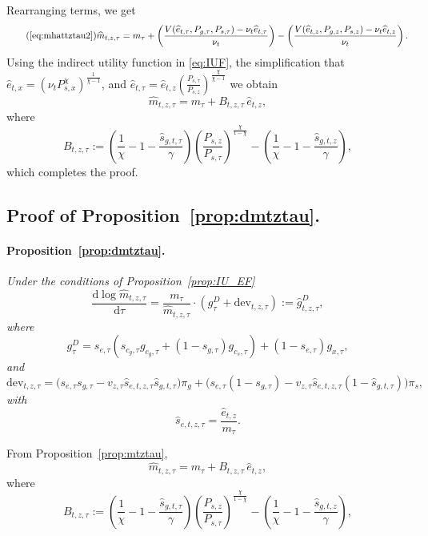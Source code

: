 \documentclass[12pt,a4paper]{article}
\begin{document}
\begin{appendices}
\noindent Rearranging terms, we get %
\[\tag{\ref{eq:mhattztau2}}
\widehat{m}_{t,z,\tau} 
= m_{\tau} +
\left( \frac{V(\widehat{e}_{t,\tau} , P_{g,\tau}, P_{s,\tau}) - \nu_t  \widehat{e}_{t,\tau}}{\nu_t}\right) 
- \left( \frac{V(\widehat{e}_{t,z} , P_{g,z}, P_{s,z}) - \nu_t  \widehat{e}_{t,z}}{\nu_t}\right) .
\]
Using the indirect utility function in \eqref{eq:IUF}, the simplification that $\widehat{e}_{t,x}=(\nu_{t}P_{s,x}^{\chi})^{\frac{1}{\chi-1}}$, and $\widehat{e}_{t,\tau}=\widehat{e}_{t,z}\left(\frac{P_{s,\tau}}{P_{s,z}}\right)^{\frac{\chi}{\chi-1}}$ we obtain
\[
\widehat{m}_{t,z,\tau} = m_{\tau} + B_{t,z,\tau} \,  \widehat e_{t,z},
\]
where
\[
B_{t,z,\tau} :=  \left(\frac{1}{\chi} - 1 - \frac{\widehat{s}_{g,t,\tau}}{\gamma} \right)  \left( \frac{P_{s,z}}{P_{s,\tau}} \right)^{\frac{\chi}{1 - \chi}}  
-  \left(\frac{1}{\chi} - 1 - \frac{\widehat{s}_{g,t,z}}{\gamma} \right),
\]
which completes the proof. \qedsymbol

\subsection{Proof of Proposition~\ref{prop:dmtztau}. }\label{app:dmtztau}

\paragraph{Proposition~\ref{prop:dmtztau}.}
{\it Under the conditions of Proposition~\ref{prop:IU_EF}}
\[
\frac{\text{d} \log \widehat{m}_{t,z,\tau}}{\text{d}\tau} = \frac{m_\tau}{\widehat m_{t,z,\tau}} \cdot \left(
g^{D}_\tau + \text{dev}_{t,z,\tau} \right) := \widehat g^{D}_{t,z,\tau},
\]
{\it where}
\[
g^D_\tau = s_{e,\tau} \left( s_{c_g,\tau} g_{c_g,\tau} + (1 - s_{g,\tau}) g_{c_s,\tau} \right) + (1 - s_{e,\tau}) g_{x,\tau}  ,
\]
{\it and}
\[
\text{dev}_{t,z,\tau} = \Big(s_{e,\tau}s_{g,\tau} - v_{z,\tau}\widehat s_{e,t,z,\tau} \widehat s_{g,t,\tau} \Big) \pi_g
+ \Big(s_{e,\tau}(1-s_{g,\tau} )-  v_{z,\tau} \widehat s_{e,t,z,\tau}  (1-\widehat s_{g,t,\tau}) \Big) \pi_s ,
\]
{\it with}
\[
 \widehat s_{e,t,z,\tau} =  \frac{\widehat e_{t,z}}{m_\tau} .
 \]

 From Proposition~\ref{prop:mtztau},
\[
\widehat{m}_{t,z,\tau} = m_{\tau} + B_{t,z,\tau} \,  \widehat e_{t,z},
\]
where
\[
B_{t,z,\tau} :=  \left(\frac{1}{\chi} - 1 - \frac{\widehat{s}_{g,t,\tau}}{\gamma} \right)  \left( \frac{P_{s,z}}{P_{s,\tau}} \right)^{\frac{\chi}{1 - \chi}}  
-  \left(\frac{1}{\chi} - 1 - \frac{\widehat{s}_{g,t,z}}{\gamma} \right),
\]



\end{appendices}
\end{document}
